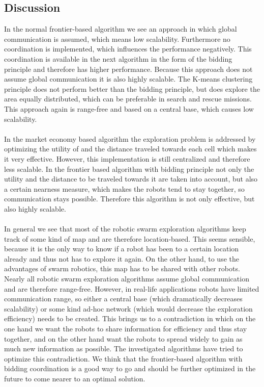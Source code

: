 \subsection{Discussion}
	In the normal frontier-based algorithm we see an approach in which global communication is assumed, which means low scalability. Furthermore no coordination is implemented, which influences the performance negatively. This coordination is available in the next algorithm in the form of the bidding principle and therefore has higher performance. Because this approach does not assume global communication it is also highly scalable. The K-means clustering principle does not perform better than the bidding principle, but does explore the area equally distributed, which can be preferable in search and rescue missions. This approach again is range-free and based on a central base, which causes low scalability.\\
	\\
	In the market economy based algorithm the exploration problem is addressed by optimizing the utility of and the distance traveled towards each cell which makes it very effective. However, this implementation is still centralized and therefore less scalable. In the frontier based algorithm with bidding principle not only the utility and the distance to be traveled towards it are taken into account, but also a certain nearness measure, which makes the robots tend to stay together, so communication stays possible. Therefore this algorithm is not only effective, but also highly scalable.\\
	\\
	In general we see that most of the robotic swarm exploration algorithms keep track of some kind of map and are therefore location-based.
	This seems sensible, because it is the only way to know if a robot has been to a certain location already and thus not has to explore it again.
	On the other hand, to use the advantages of swarm robotics, this map has to be shared with other robots.
	Nearly all robotic swarm exploration algorithms assume global communication and are therefore range-free.
	However, in real-life applications robots have limited communication range, so either a central base (which dramatically decreases scalability) or some kind ad-hoc network (which would decrease the exploration efficiency) needs to be created.
	This brings us to a contradiction in which on the one hand we want the robots to share information for efficiency and thus stay together, and on the other hand want the robots to spread widely to gain as much new information as possible.
	The investigated algorithms have tried to optimize this contradiction. We think that the frontier-based algorithm with bidding coordination is a good way to go and should be further optimized in the future to come nearer to an optimal solution.



